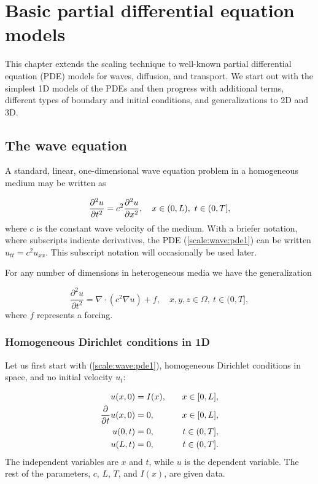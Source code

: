 \documentclass[graybox,envcountchap,sectrefs,final]{svmonodo}
\begin{document}
\chapter{Basic partial differential equation models}

This chapter extends the scaling technique to well-known partial differential
equation (PDE) models for waves, diffusion, and transport.
We start out with the simplest 1D models of the PDEs and then progress
with additional terms, different types of boundary and initial conditions,
and generalizations to 2D and 3D.

\section{The wave equation}
\label{sec:scale:wave}

A standard, linear, one-dimensional wave equation problem
in a homogeneous medium may be written as

\begin{equation}
\frac{\partial^2 u}{\partial t^2} =
c^2 {\partial^2 u\over\partial x^2}, \quad  x\in (0,L),\ t\in (0,T],
\label{scale:wave:pde1}
\end{equation}
where $c$ is the constant wave velocity of the medium.
With a briefer notation, where subscripts indicate derivatives,
the PDE (\ref{scale:wave:pde1}) can be written
$u_{tt}=c^2u_{xx}$. This subscript notation will occasionally be
used later.

For any number of dimensions in heterogeneous media we have the generalization

\begin{equation}
\frac{\partial^2 u}{\partial t^2} =
\nabla\cdot\left(c^2 \nabla u\right) + f, \quad  x,y,z\in \Omega,\ t\in (0,T],
\label{scale:wave:pde1:3D}
\end{equation}
where $f$ represents a forcing.

\subsection{Homogeneous Dirichlet conditions in 1D}
\label{sec:scale:wave:bc_u0}

Let us first start with (\ref{scale:wave:pde1}),
homogeneous Dirichlet conditions in space, and
no initial velocity $u_t$:

\begin{align}
u(x,0) &= I(x), \quad &x\in [0,L],
\label{scale:wave:pde1:ic:u}\\ 
{\partial\over\partial t}u(x,0) &= 0, \quad & x\in [0,L],
\label{scale:wave:pde1:ic:ut}\\ 
u(0,t) & = 0, \quad  & t\in (0,T],
\label{scale:wave:pde1:bc:0}\\ 
u(L,t) & = 0, \quad  & t\in (0,T].
\label{scale:wave:pde1:bc:L}
\end{align}
The independent variables are $x$ and $t$, while $u$ is the dependent
variable.
The rest of the parameters, $c$, $L$, $T$, and $I(x)$, are given data.
\end{document}
